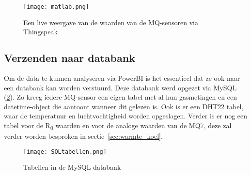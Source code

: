 \begin{figure}[h]
    \texttt{[image: matlab.png]}
    \caption[Thingspeak live]{Een live weergave van de waarden van de MQ-sensoren via Thingspeak}
    \label{fig:matlab}
\end{figure}


\subsection{Verzenden naar databank}
\label{subsec:database}

Om de data te kunnen analyseren via PowerBI is het essentieel dat ze ook naar een databank kan worden verstuurd. Deze databank werd opgezet via MySQL (\ref{fig:SQLtabellen}). Zo kreeg iedere MQ-sensor een eigen tabel met al hun gasmetingen en een datetime-object die aantoont wanneer dit gelezen is. Ook is er een DHT22 tabel, waar de temperatuur en luchtvochtigheid worden opgeslagen. Verder is er nog een tabel voor de R\textsubscript{0} waarden en voor de analoge waarden van de MQ7, deze zal verder worden besproken in sectie~\ref{sec:warmte_koel}.

\begin{figure}[h]
    \texttt{[image: SQLtabellen.png]}
    \caption[Tabellen in de databank]{Tabellen in de MySQL databank}
    \label{fig:SQLtabellen}
\end{figure}

